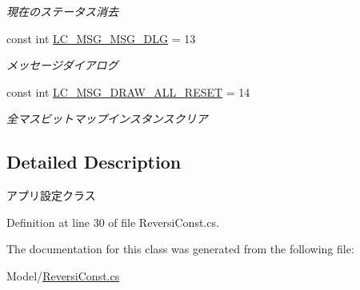 \begin{DoxyCompactItemize}
\begin{DoxyCompactList}\small\item\em 現在のステータス消去 \end{DoxyCompactList}\item 
\mbox{\label{class_reversi4color_wpf_1_1_reversi_const_a7cc51ce8f936f69e2da29c5e1a84c851}} 
const int \hyperlink{class_reversi4color_wpf_1_1_reversi_const_a7cc51ce8f936f69e2da29c5e1a84c851}{L\+C\+\_\+\+M\+S\+G\+\_\+\+M\+S\+G\+\_\+\+D\+LG} = 13
\begin{DoxyCompactList}\small\item\em メッセージダイアログ \end{DoxyCompactList}\item 
\mbox{\label{class_reversi4color_wpf_1_1_reversi_const_ac4ac73a6528f9fe62acb0b2f17d5777b}} 
const int \hyperlink{class_reversi4color_wpf_1_1_reversi_const_ac4ac73a6528f9fe62acb0b2f17d5777b}{L\+C\+\_\+\+M\+S\+G\+\_\+\+D\+R\+A\+W\+\_\+\+A\+L\+L\+\_\+\+R\+E\+S\+ET} = 14
\begin{DoxyCompactList}\small\item\em 全マスビットマップインスタンスクリア \end{DoxyCompactList}\end{DoxyCompactItemize}


\subsection{Detailed Description}
アプリ設定クラス 

Definition at line 30 of file Reversi\+Const.\+cs.



The documentation for this class was generated from the following file\+:\begin{DoxyCompactItemize}
\item 
Model/\hyperlink{_reversi_const_8cs}{Reversi\+Const.\+cs}\end{DoxyCompactItemize}
